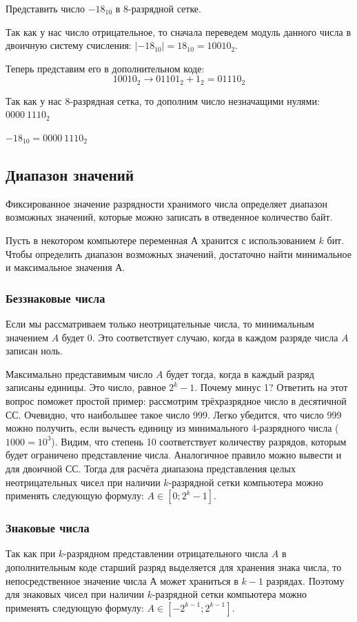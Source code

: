 \begin{example}
    \task%
    Представить число $-18_{10}$ в 8-разрядной сетке.

    \solution%
    Так как у нас число отрицательное, то сначала переведем модуль данного числа в двоичную систему счисления: $\left|-18_{10}\right| = 18_{10} = 10010_{2}$.

    Теперь представим его в дополнительном коде:
    \[10010_{2} \to 01101_{2} + 1_{2} = 01110_{2}\]

    Так как у нас 8-разрядная сетка, то дополним число незначащими нулями: $0000~1110_{2}$

    \answer%
    $-18_{10} = 0000~1110_{2}$
\end{example}

\subsection{Диапазон значений}\label{subsec:range-of-values}
Фиксированное значение разрядности хранимого числа определяет диапазон возможных значений, которые можно записать в отведенное количество байт.

Пусть в некотором компьютере переменная А хранится с использованием $k$ бит. Чтобы определить диапазон возможных значений, достаточно найти минимальное и максимальное значения А.

\subsubsection{Беззнаковые числа}\label{subsubsec:unsigned-numbers}
Если мы рассматриваем только неотрицательные числа, то минимальным значением $A$ будет 0. Это соответствует случаю, когда в каждом разряде числа $A$ записан ноль.

Максимально представимым число $A$ будет тогда, когда в каждый разряд записаны единицы. Это число, равное $2^k-1$.
Почему минус 1? Ответить на этот вопрос поможет простой пример: рассмотрим трёхразрядное число в десятичной СС. Очевидно, что наибольшее такое число 999. Легко убедится, что число 999 можно получить, если вычесть единицу из минимального 4-разрядного числа ($1000 = 10^3$). Видим, что степень 10 соответствует количеству разрядов, которым будет ограничено представление числа. Аналогичное правило можно вывести и для двоичной СС. Тогда для расчёта диапазона представления целых неотрицательных чисел при наличии $k$-разрядной сетки компьютера можно применять следующую формулу: $A \in [0;2^k-1]$.

\subsubsection{Знаковые числа}\label{subsubsec:signed-numbers}
Так как при $k$-разрядном представлении отрицательного числа $A$ в дополнительным коде старший разряд выделяется для хранения знака числа, то непосредственное значение числа А может храниться в $k-1$ разрядах. Поэтому для знаковых чисел при наличии $k$-разрядной сетки компьютера можно применять следующую формулу: $A \in [-2^{k-1};2^{k-1}]$.

